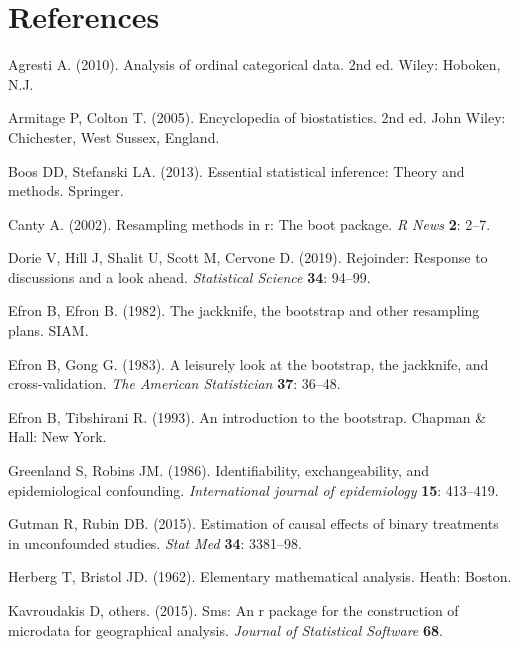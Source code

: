 \documentclass[
]{article}
\begin{document}
\hypertarget{references}{%
\section*{References}\label{references}}

\hypertarget{refs}{}
\leavevmode\hypertarget{ref-Agresti2010}{}%
Agresti A. (2010). Analysis of ordinal categorical data. 2nd ed. Wiley:
Hoboken, N.J.

\leavevmode\hypertarget{ref-Armi2005}{}%
Armitage P, Colton T. (2005). Encyclopedia of biostatistics. 2nd ed.
John Wiley: Chichester, West Sussex, England.

\leavevmode\hypertarget{ref-Boos2013}{}%
Boos DD, Stefanski LA. (2013). Essential statistical inference: Theory
and methods. Springer.

\leavevmode\hypertarget{ref-boostrap2003}{}%
Canty A. (2002). Resampling methods in r: The boot package. \emph{R
News} \textbf{2}: 2--7.

\leavevmode\hypertarget{ref-Dorie_2019}{}%
Dorie V, Hill J, Shalit U, Scott M, Cervone D. (2019). Rejoinder:
Response to discussions and a look ahead. \emph{Statistical Science}
\textbf{34}: 94--99.

\leavevmode\hypertarget{ref-efron1982}{}%
Efron B, Efron B. (1982). The jackknife, the bootstrap and other
resampling plans. SIAM.

\leavevmode\hypertarget{ref-efron1983}{}%
Efron B, Gong G. (1983). A leisurely look at the bootstrap, the
jackknife, and cross-validation. \emph{The American Statistician}
\textbf{37}: 36--48.

\leavevmode\hypertarget{ref-Efron1993}{}%
Efron B, Tibshirani R. (1993). An introduction to the bootstrap. Chapman
\& Hall: New York.

\leavevmode\hypertarget{ref-robins1986}{}%
Greenland S, Robins JM. (1986). Identifiability, exchangeability, and
epidemiological confounding. \emph{International journal of
epidemiology} \textbf{15}: 413--419.

\leavevmode\hypertarget{ref-Gutman2015}{}%
Gutman R, Rubin DB. (2015). Estimation of causal effects of binary
treatments in unconfounded studies. \emph{Stat Med} \textbf{34}:
3381--98.

\leavevmode\hypertarget{ref-Herberg1962}{}%
Herberg T, Bristol JD. (1962). Elementary mathematical analysis. Heath:
Boston.

\leavevmode\hypertarget{ref-kavroudakis2015}{}%
Kavroudakis D, others. (2015). Sms: An r package for the construction of
microdata for geographical analysis. \emph{Journal of Statistical
Software} \textbf{68}.
\end{document}
